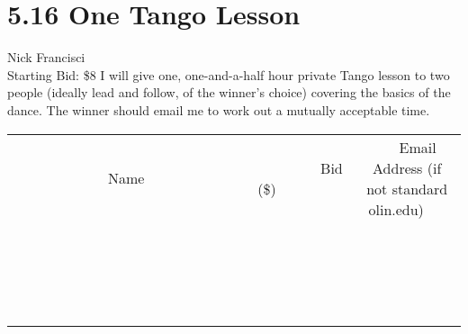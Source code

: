 \documentclass[11pt]{article}
\begin{document}
\section*{5.16 One Tango Lesson}
Nick Francisci
\\
Starting Bid: \$8
\newline
I will give one, one-and-a-half hour private Tango lesson to two people (ideally lead and follow, of the winner's choice) covering the basics of the dance. The winner should email me to work out a mutually acceptable time.
\\[3ex]
\begin{tabular}{c c c}
~~~~~~~~~~~~~Name~~~~~~~~~~~~~ & ~~~~~~~~~Bid (\$)~~~~~~~~~  & ~~~Email Address (if not standard olin.edu)~~~\\
 & & \\
\hline
 & & \\
\hline
 & & \\
\hline
 & & \\
\hline
 & & \\
\hline
 & & \\
\hline
 & & \\
\hline
 & & \\
\hline
 & & \\
\hline
 & & \\
\hline
 & & \\
\hline
 & & \\
\hline
 & & \\
\hline
 & & \\
\hline
 & & \\
\hline
 & & \\
\hline
 & & \\
\hline
 & & \\
\hline
 & & \\
\hline
\end{tabular}
\newpage
\end{document}

